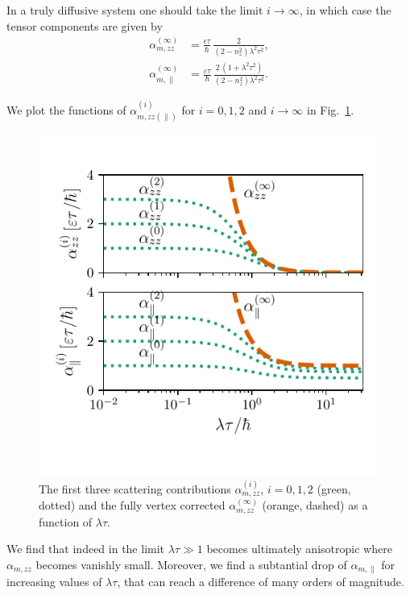 In a truly diffusive system one should take the limit $i\rightarrow\infty$, in which case the tensor components are given by
\begin{align}
\label{eq:alphaparallelzerodelta}
    \alpha_{m,zz}^{(\infty)} &= \frac{\epsilon \tau}{\hbar}\, \frac{2}{(2-n_z^2)\lambda^2\tau^2},\\
    \alpha_{m,\parallel}^{(\infty)} &= \frac{\varepsilon\tau}{\hbar}\,\frac{2\,(1+\lambda^2\tau^2)}{(2-n_z^2)\lambda^2\tau^2}.
\end{align}

We plot the functions of $\alpha_{m,zz(\parallel)}^{(i)}$ for $i=0,1,2$ and $i\rightarrow\infty$ in Fig.~\ref{fig:alpha_plot}. 
\begin{figure}
    \centering
    \includegraphics[width=\linewidth]{gfx/Chapter04/alpha_plot2}
    \caption{The first three scattering contributions $\alpha_{m,zz}^{(i)}$, $i=0,1,2$ (green, dotted) and the fully vertex corrected $\alpha_{m,zz}^{(\infty)}$ (orange, dashed) as a function of $\lambda \tau$. }
    \label{fig:alpha_plot}
\end{figure}
We find that indeed in the limit $\lambda\tau\gg1$ becomes ultimately anisotropic where $\alpha_{m,zz}$ becomes vanishly small. Moreover, we find a subtantial drop of $\alpha_{m,\parallel}$ for increasing values of $\lambda\tau$, that can reach a difference of many orders of magnitude. 

